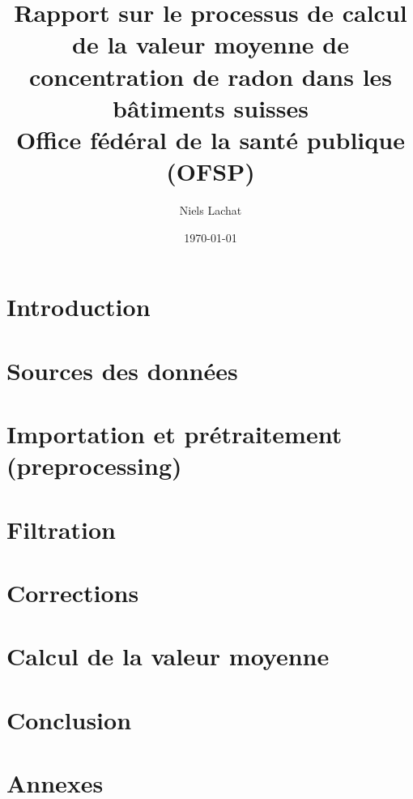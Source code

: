 \documentclass{report}
\title{
{Rapport sur le processus de calcul de la valeur moyenne de concentration de radon dans les bâtiments suisses}\\
{\large Office fédéral de la santé publique (OFSP)}\\
}
\author{Niels Lachat}
\date{\today}
\begin{document}
\maketitle

\tableofcontents

\chapter{Introduction}


\chapter{Sources des données}\label{chapterSourcesDesDonnees}


\chapter{Importation et prétraitement (preprocessing)}\label{chapterImportationEtPretraitement}


\chapter{Filtration}


\chapter{Corrections}


\chapter{Calcul de la valeur moyenne}


\chapter{Conclusion}


\chapter{Annexes}

\end{document}
